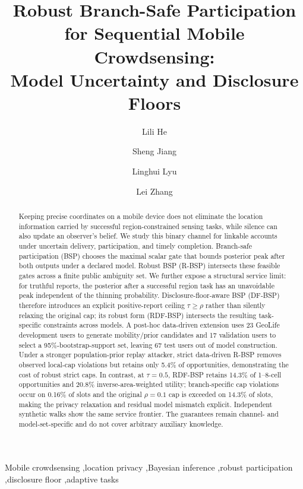 \documentclass[review,12pt]{elsarticle}
\begin{document}
\begin{frontmatter}
\title{Robust Branch-Safe Participation for Sequential Mobile Crowdsensing:\\Model Uncertainty and Disclosure Floors}
\author[aff1]{Lili He}
\author[aff1]{Sheng Jiang}
\author[aff1]{Linghui Lyu}
\author[aff1]{Lei Zhang}
\address[aff1]{College of Information and Electronic Technology, Jiamusi University, Jiamusi 154007, China}
\begin{abstract}
Keeping precise coordinates on a mobile device does not eliminate the location information carried by successful region-constrained sensing tasks, while silence can also update an observer's belief. We study this binary channel for linkable accounts under uncertain delivery, participation, and timely completion. Branch-safe participation (BSP) chooses the maximal scalar gate that bounds posterior peak after both outputs under a declared model. Robust BSP (R-BSP) intersects these feasible gates across a finite public ambiguity set. We further expose a structural service limit: for truthful reports, the posterior after a successful region task has an unavoidable peak independent of the thinning probability. Disclosure-floor-aware BSP (DF-BSP) therefore introduces an explicit positive-report ceiling $\tau\ge\rho$ rather than silently relaxing the original cap; its robust form (RDF-BSP) intersects the resulting task-specific constraints across models. A post-hoc data-driven extension uses 23 GeoLife development users to generate mobility/prior candidates and 17 validation users to select a 95\%-bootstrap-support set, leaving 67 test users out of model construction. Under a stronger population-prior replay attacker, strict data-driven R-BSP removes observed local-cap violations but retains only 5.4\% of opportunities, demonstrating the cost of robust strict caps. In contrast, at $\tau=0.5$, RDF-BSP retains 14.3\% of 1--8-cell opportunities and 20.8\% inverse-area-weighted utility; branch-specific cap violations occur on 0.16\% of slots and the original $\rho=0.1$ cap is exceeded on 14.3\% of slots, making the privacy relaxation and residual model mismatch explicit. Independent synthetic walks show the same service frontier. The guarantees remain channel- and model-set-specific and do not cover arbitrary auxiliary knowledge.
\end{abstract}
\begin{keyword}
Mobile crowdsensing \sep location privacy \sep Bayesian inference \sep robust participation \sep disclosure floor \sep adaptive tasks
\end{keyword}
\end{frontmatter}
\end{document}
